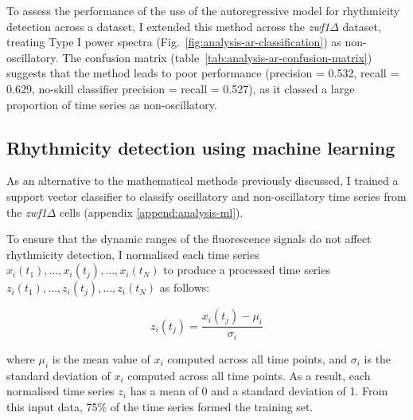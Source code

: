 To assess the performance of the use of the autoregressive model for rhythmicity detection across a dataset, I extended this method across the \textit{zwf1$\Delta$} dataset, treating Type I power spectra (Fig.\ \ref{fig:analysis-ar-classification}) as non-oscillatory.
The confusion matrix (table~\ref{tab:analysis-ar-confusion-matrix}) suggests that the method leads to poor performance (precision = 0.532, recall = 0.629, no-skill classifier precision = recall = 0.527), as it classed a large proportion of time series as non-oscillatory.


\subsection{Rhythmicity detection using machine learning}
\label{subsec:analysis-classification-ml}

As an alternative to the mathematical methods previously discussed, I trained a support vector classifier to classify oscillatory and non-oscillatory time series from the \textit{zwf1$\Delta$} cells (appendix \ref{append:analysis-ml}).

To ensure that the dynamic ranges of the fluorescence signals do not affect rhythmicity detection, I normalised each time series $x_{i}(t_{1}), \ldots , x_{i}(t_{j}), \ldots , x_{i}(t_{N})$ to produce a processed time series $z_{i}(t_{1}), \ldots , z_{i}(t_{j}), \ldots , z_{i}(t_{N})$ as follows:

\begin{equation}
  z_{i}(t_{j}) = \frac{x_{i}(t_{j}) - \mu_{i}}{\sigma_{i}}
  \label{eq:analysis-stdscore}
\end{equation}

where $\mu_{i}$ is the mean value of $x_{i}$ computed across all time points, and $\sigma_{i}$ is the standard deviation of $x_{i}$ computed across all time points.
As a result, each normalised time series $z_{i}$ has a mean of 0 and a standard deviation of 1.
From this input data, 75\% of the time series formed the training set.

